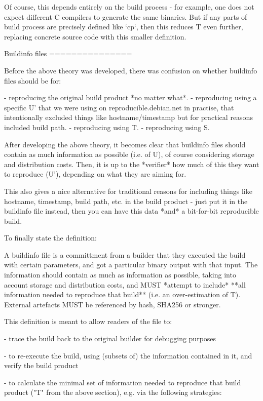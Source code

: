 Of course, this depends entirely on the build process - for example, one does
not expect different C compilers to generate the same binaries. But if any
parts of build process are precisely defined like `cp`, then this reduces T
even further, replacing concrete source code with this smaller definition.


Buildinfo files
===============

Before the above theory was developed, there was confusion on whether buildinfo
files should be for:

- reproducing the original build product *no matter what*.
- reproducing using a specific U' that we were using on reproducible.debian.net
  in practise, that intentionally excluded things like hostname/timestamp but
  for practical reasons included build path.
- reproducing using T.
- reproducing using S.

After developing the above theory, it becomes clear that buildinfo files should
contain as much information as possible (i.e. of U), of course considering
storage and distribution costs. Then, it is up to the *verifier* how much of
this they want to reproduce (U'), depending on what they are aiming for.

This also gives a nice alternative for traditional reasons for including things
like hostname, timestamp, build path, etc. in the build product - just put it
in the buildinfo file instead, then you can have this data *and* a bit-for-bit
reproducible build.

To finally state the definition:

A buildinfo file is a committment from a builder that they executed the build
with certain parameters, and got a particular binary output with that input.
The information should contain as much as information as possible, taking into
account storage and distribution costs, and MUST *attempt to include* **all
information needed to reproduce that build** (i.e. an over-estimation of T).
External artefacts MUST be referenced by hash, SHA256 or stronger.

This definition is meant to allow readers of the file to:

- trace the build back to the original builder for debugging purposes

- to re-execute the build, using (subsets of) the information contained in it,
  and verify the build product

- to calculate the minimal set of information needed to reproduce that build
  product ("T" from the above section), e.g. via the following strategies:

